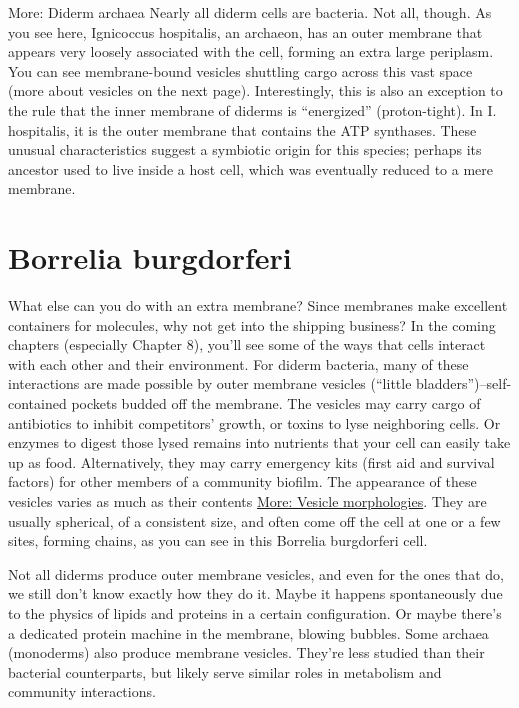 \documentclass[]{tufte-book}
\begin{document}
More: Diderm archaea Nearly all diderm cells are bacteria. Not all,
though. As you see here, Ignicoccus hospitalis, an archaeon, has an
outer membrane that appears very loosely associated with the cell,
forming an extra large periplasm. You can see membrane-bound vesicles
shuttling cargo across this vast space (more about vesicles on the next
page). Interestingly, this is also an exception to the rule that the
inner membrane of diderms is ``energized'' (proton-tight). In I.
hospitalis, it is the outer membrane that contains the ATP synthases.
These unusual characteristics suggest a symbiotic origin for this
species; perhaps its ancestor used to live inside a host cell, which was
eventually reduced to a mere membrane.

\section{Borrelia burgdorferi}\label{borrelia-burgdorferi}

What else can you do with an extra membrane? Since membranes make
excellent containers for molecules, why not get into the shipping
business? In the coming chapters (especially Chapter 8), you'll see some
of the ways that cells interact with each other and their environment.
For diderm bacteria, many of these interactions are made possible by
outer membrane vesicles (``little bladders'')--self-contained pockets
budded off the membrane. The vesicles may carry cargo of antibiotics to
inhibit competitors' growth, or toxins to lyse neighboring cells. Or
enzymes to digest those lysed remains into nutrients that your cell can
easily take up as food. Alternatively, they may carry emergency kits
(first aid and survival factors) for other members of a community
biofilm. The appearance of these vesicles varies as much as their
contents \protect\hyperlink{Vesicle_morphologies}{More: Vesicle
morphologies}. They are usually spherical, of a consistent size, and
often come off the cell at one or a few sites, forming chains, as you
can see in this Borrelia burgdorferi cell.

Not all diderms produce outer membrane vesicles, and even for the ones
that do, we still don't know exactly how they do it. Maybe it happens
spontaneously due to the physics of lipids and proteins in a certain
configuration. Or maybe there's a dedicated protein machine in the
membrane, blowing bubbles. Some archaea (monoderms) also produce
membrane vesicles. They're less studied than their bacterial
counterparts, but likely serve similar roles in metabolism and community
interactions.
\end{document}
